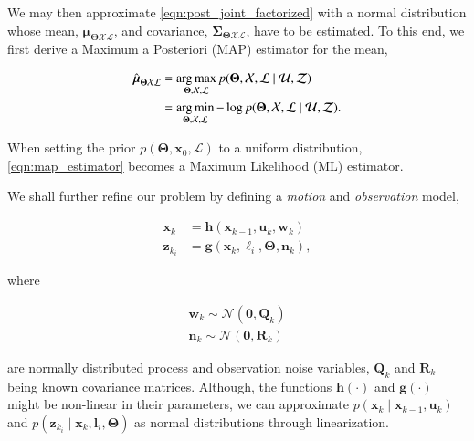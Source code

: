 \noindent We may then approximate \eqref{eqn:post_joint_factorized} with a
normal distribution whose mean, $\boldsymbol{\mu}_{\boldsymbol{\Theta}
\mathcal{X}\mathcal{L}}$, and covariance, $\boldsymbol{\Sigma}_
{\boldsymbol{\Theta}\mathcal{X}\mathcal{L}}$, have to be estimated. To this end,
we first derive a Maximum a Posteriori (MAP) estimator for the mean,

\begin{equation}\label{eqn:map_estimator}
  \begin{aligned}
  \hat{\boldsymbol{\mu}}_{\boldsymbol{\Theta}\mathcal{X}\mathcal{L}} &=
    \operatorname*{arg\,max}_{\boldsymbol{\Theta},\mathcal{X},\mathcal{L}}
    p(\boldsymbol{\Theta}, \mathcal{X},\mathcal{L} \mid\mathcal{U},\mathcal{Z})
    \\
    &= \operatorname*{arg\,min}_{\boldsymbol{\Theta},\mathcal{X},\mathcal{L}}-\log
    p(\boldsymbol{\Theta}, \mathcal{X},\mathcal{L} \mid\mathcal{U},\mathcal{Z}).
  \end{aligned}
\end{equation}

\noindent When setting the prior $p(\boldsymbol{\Theta}, \mathbf{x}_0,
\mathcal{L})$ to a uniform distribution, \eqref{eqn:map_estimator} becomes a
Maximum Likelihood (ML) estimator.

We shall further refine our problem by defining a \emph{motion} and
\emph{observation} model,

\begin{equation}\label{eqn:process_model}
  \begin{aligned}
  \mathbf{x}_k &= \mathbf{h}(\mathbf{x}_{k-1}, \mathbf{u}_k, \mathbf{w}_k)\\
  \mathbf{z}_{k_i} &= \mathbf{g}(\mathbf{x}_{k}, \boldsymbol{\ell}_i,
    \boldsymbol{\Theta}, \mathbf{n}_k),
  \end{aligned}
\end{equation}

\noindent where

\begin{equation}\label{eqn:noise_model}
  \begin{aligned}
  \mathbf{w}_k \sim \mathcal{N}(\mathbf{0},\mathbf{Q}_k)\\
  \mathbf{n}_k \sim \mathcal{N}(\mathbf{0},\mathbf{R}_k)
  \end{aligned}
\end{equation}

\noindent are normally distributed process and observation noise variables,
$\mathbf{Q}_k$ and $\mathbf{R}_k$ being known covariance matrices. Although, the
functions $\mathbf{h}(\cdot)$ and $\mathbf{g}(\cdot)$ might be non-linear in
their parameters, we can approximate
$p(\mathbf{x}_k\mid\mathbf{x}_{k - 1},\mathbf{u}_k)$ and
$p(\mathbf{z}_{k_i}\mid\mathbf{x}_k, \mathbf{l}_i,\boldsymbol{\Theta})$ as
normal distributions through linearization.

